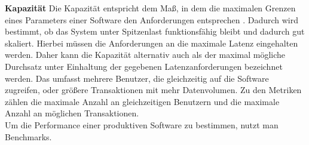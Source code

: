 \noindent
\textbf{Kapazität}\newline
Die Kapazität entspricht dem Maß, in dem die maximalen Grenzen eines Parameters einer Software den Anforderungen entsprechen \cite{ISOIEC.}. Dadurch wird bestimmt, ob das System unter Spitzenlast funktionsfähig bleibt und dadurch gut skaliert. Hierbei müssen die Anforderungen an die maximale Latenz eingehalten werden. Daher kann die Kapazität alternativ auch als der maximal mögliche Durchsatz unter Einhaltung der gegebenen Latenzanforderungen bezeichnet werden. \cite{Barbacci.1995}  Das umfasst mehrere Benutzer, die gleichzeitig auf die Software zugreifen, oder größere Transaktionen mit mehr Datenvolumen. Zu den Metriken zählen die maximale Anzahl an gleichzeitigen Benutzern und die maximale Anzahl an möglichen Transaktionen.   \\


\noindent
Um die Performance einer produktiven Software zu bestimmen, nutzt man Benchmarks. \\